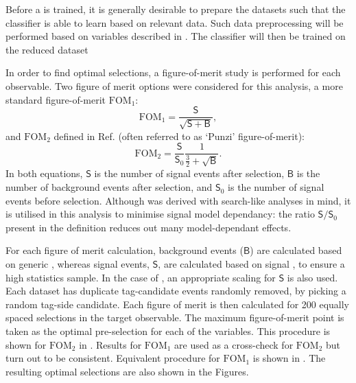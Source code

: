 Before a \BDT is trained, it is generally desirable to prepare the datasets such that the classifier 
is able to learn based on relevant data.
Such data preprocessing will be performed based on variables described in .
The classifier will then be trained on the reduced dataset

In order to find optimal selections, a figure-of-merit study is performed for each observable.
Two figure of merit options were considered for this analysis, a more standard figure-of-merit $\mathrm{FOM}_1$:
\begin{equation}\label{eq:soversqrtsplusb}
    \mathrm{FOM}_1 = \frac{\mathsf{S}}{\sqrt{\mathsf{S}+\mathsf{B}}},
\end{equation}
and $\mathrm{FOM}_2$ defined in Ref.\cite{Punzi:2003bu} (often referred to as `Punzi' figure-of-merit):
\begin{equation}\label{eq:punzi_fom}
    \mathrm{FOM}_2 = \frac{\mathsf{S}}{\mathsf{S}_0} \frac{1}{\frac{3}{2}+\sqrt{\mathsf{B}}}.
\end{equation}
In both equations, $\mathsf{S}$ is the number of signal events after selection, 
$\mathsf{B}$ is the number of background events after selection, 
and $\mathsf{S}_0$ is the number of signal events before selection.
Although  was derived with search-like analyses in mind, 
it is utilised in this analysis to minimise signal model dependancy: the ratio $\mathsf{S}/\mathsf{S}_0$ present in the definition reduces out many model-dependant effects.

For each figure of merit calculation, background events ($\mathsf{B}$) are calculated based on generic \MC,
whereas signal events, $\mathsf{S}$, are calculated based on signal \MC, to ensure a high statistics sample.
In the case of , an appropriate scaling for $\mathsf{S}$ is also used.
Each dataset has duplicate tag-candidate events randomly removed, by picking a random tag-side candidate.
Each figure of merit is then calculated for 200 equally spaced selections in the target observable.
The maximum figure-of-merit point is taken as the optimal pre-selection for each of the variables.
This procedure is shown for $\mathrm{FOM}_2$ in .
Results for $\mathrm{FOM}_1$ are used as a cross-check for $\mathrm{FOM_2}$ but turn out to be consistent.
Equivalent procedure for $\mathrm{FOM}_1$ is shown in .
The resulting optimal selections are also shown in the Figures.

